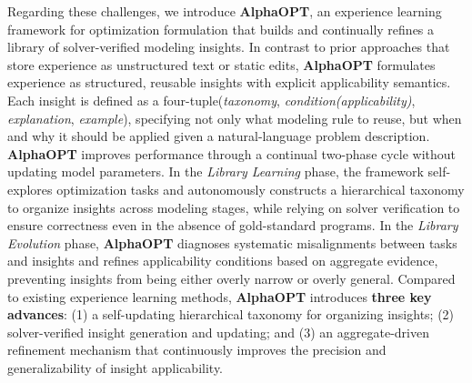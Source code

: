 \documentclass[sigconf, nonacm]{acmart}
\begin{document}
Regarding these challenges, we introduce \textbf{AlphaOPT}, an experience learning framework for optimization formulation that builds and continually refines a library of solver-verified modeling insights. In contrast to prior approaches that store experience as unstructured text or static edits, \textbf{AlphaOPT} formulates experience as structured, reusable insights with explicit applicability semantics. Each insight is defined as a four-tuple(\emph{taxonomy}, \emph{condition(applicability)}, \emph{explanation}, \emph{example}), specifying not only what modeling rule to reuse, but when and why it should be applied given a natural-language problem description. \textbf{AlphaOPT} improves performance through a continual two-phase cycle without updating model parameters. In the \emph{Library Learning} phase, the framework self-explores optimization tasks and autonomously constructs a hierarchical taxonomy to organize insights across modeling stages, while relying on solver verification to ensure correctness even in the absence of gold-standard programs. In the \emph{Library Evolution} phase, \textbf{AlphaOPT} diagnoses systematic misalignments between tasks and insights and refines applicability conditions based on aggregate evidence, preventing insights from being either overly narrow or overly general. Compared to existing experience learning methods, \textbf{AlphaOPT} introduces \textbf{three key advances}: (1) a self-updating hierarchical taxonomy for organizing insights; (2) solver-verified insight generation and updating; and (3) an aggregate-driven refinement mechanism that continuously improves the precision and generalizability of insight applicability.


% 
\end{document}
